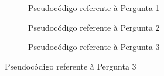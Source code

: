 \begin{figure}[h!]
    \centering
    \begin{subfigure}[t]{0.5\textwidth}
        \centering
        \setlength{\fboxrule}{0.1pt} %
        \caption{Pseudocódigo referente à Pergunta 1}
        \label{figure:atividade_festa_1}
    \end{subfigure}
    \par\bigskip %
    \begin{subfigure}[t]{0.5\textwidth}
        \centering
        \setlength{\fboxrule}{0.1pt} %
        \caption{Pseudocódigo referente à Pergunta 2}
        \label{figure:atividade_festa_2}
    \end{subfigure}
    \par\bigskip %
    \begin{subfigure}[t]{0.5\textwidth}
        \centering
        \setlength{\fboxrule}{0.1pt} %
        \caption{Pseudocódigo referente à Pergunta 3}
        \label{figure:atividade_festa_3}
    \end{subfigure}

\end{figure}
